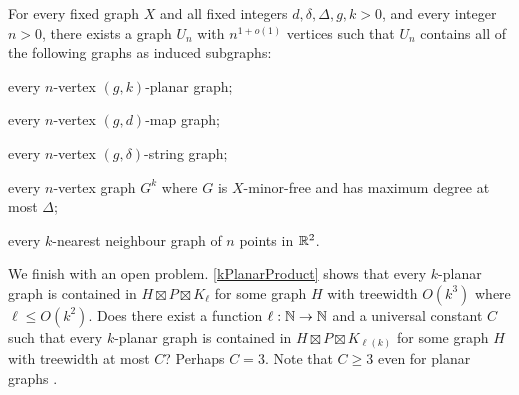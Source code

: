\documentclass{patmorin}
\newcommand{\note}[2]{\noindent{\color{red}[#1:~#2]}}
\renewcommand{\geq}{\geqslant}
\renewcommand{\leq}{\leqslant}
\begin{document}
\begin{thm}
	\label{UniversalUniversal}
	For every fixed graph $X$ and all fixed integers $d,\delta,\Delta,g,k>0$, and every integer
	$n>0$, there exists a graph $U_n$ with $n^{1+o(1)}$ vertices such that
	$U_n$ contains all of the following graphs as induced subgraphs:
	\begin{compactitem}
		\item every $n$-vertex $(g,k)$-planar graph;
		\item every $n$-vertex $(g,d)$-map graph;
		\item every $n$-vertex $(g,\delta)$-string graph;
		\item every $n$-vertex graph $G^k$ where $G$ is $X$-minor-free and has maximum degree at most $\Delta$;
		\item every $k$-nearest neighbour graph of $n$ points in $\mathbb{R}^2$.
	\end{compactitem}
\end{thm}

We finish with an open problem. \cref{kPlanarProduct} shows that every $k$-planar graph is contained in $H\boxtimes P \boxtimes K_\ell$ for some graph $H$ with treewidth $O(k^3)$ where $\ell\leq O(k^2)$. Does there exist a function $\ell:\mathbb{N}\to\mathbb{N}$ and a universal constant $C$ such that every $k$-planar graph is contained in $H\boxtimes P \boxtimes K_{\ell(k)}$ for some graph $H$ with treewidth at most $C$?  Perhaps $C=3$. Note that $C\geq 3$ even for planar graphs \citep{DJMMUW20}.


   \let\oldthebibliography=\thebibliography
   \let\endoldthebibliography=\endthebibliography
   \renewenvironment{thebibliography}[1]{%
     \begin{oldthebibliography}{#1}%
       \setlength{\parskip}{0ex}%
       \setlength{\itemsep}{0ex}%
   }{\end{oldthebibliography}}
\end{document}

